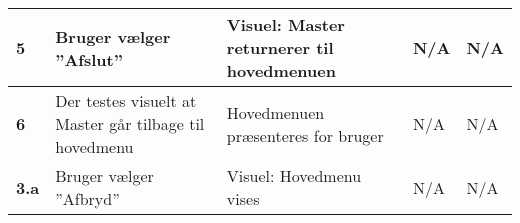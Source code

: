 \begin{center}
\begin{longtable}{|p{}|p{}|p{}|p{}|p{}|}
\textbf{5}	&Bruger vælger ''Afslut''
			&Visuel: Master returnerer til hovedmenuen
			&N/A
			&N/A \\ \hline 
			
\textbf{6}	&Der testes visuelt at Master går tilbage til hovedmenu
			&Hovedmenuen præsenteres for bruger
			&N/A
			&N/A \\ \hline 
			
\textbf{3.a}	&Bruger vælger ''Afbryd''
			&Visuel: Hovedmenu vises
			&N/A
			&N/A \\ \hline  
			
\end{longtable}
	\label{ATUC3} 
\end{center} 